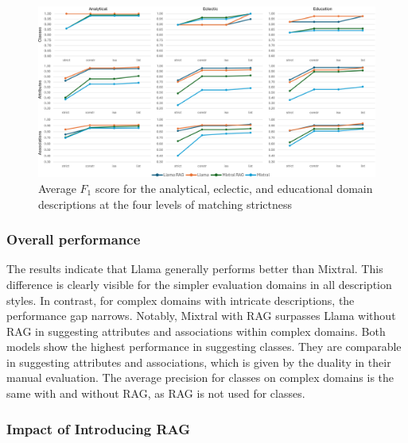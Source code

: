 \begin{figure}[!h]
    \centering
    \includegraphics[scale=0.10]{img/evaluation-simple-f1.png}
    \caption{\centering Average $F_1$ score for the analytical, eclectic, and educational domain descriptions at the four levels of matching strictness}
    \label{fig:evaluation-simple-f1}
\end{figure}


\subsubsection{Overall performance}

The results indicate that Llama generally performs better than Mixtral.
This difference is clearly visible for the simpler evaluation domains in all description styles.
In contrast, for complex domains with intricate descriptions, the performance gap narrows.
Notably, Mixtral with RAG surpasses Llama without RAG in suggesting attributes and associations within complex domains.
Both models show the highest performance in suggesting classes.
They are comparable in suggesting attributes and associations, which is given by the duality in their manual evaluation.
The average precision for classes on complex domains is the same with and without RAG, as RAG is not used for classes.


\subsubsection{Impact of Introducing RAG}

